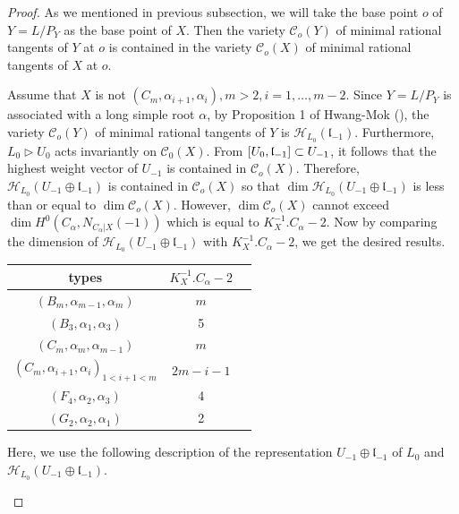 \documentclass[12pt]{amsart}
\theoremstyle{plain}
\theoremstyle{definition}
\begin{document}
\begin{proof} As we mentioned in previous subsection, we will take the base point $o$ of $Y=L/P_Y$ as the base point of $X$.  Then the variety $\mathcal C_o(Y)$ of minimal rational tangents of $Y$ at $o$  is contained in the variety $\mathcal C_o(X)$ of minimal rational tangents of $X$ at $o$.

\medskip
Assume that $X$ is not $(C_m, \alpha_{i+1}, \alpha_{i}), m>2, i=1,\ldots, m-2$. Since $Y=L/P_Y$ is associated with a long simple root $\alpha$, by Proposition 1 of Hwang-Mok (\cite{HM02}), the variety $\mathcal C_o(Y)$ of minimal rational tangents of $Y$ is  $\mathcal H_{L_0}(\mathfrak l_{-1})$. Furthermore, $L_0 \rhd U_{0}$ acts invariantly on $\mathcal C_0(X)$. From $[U_{0}, \frak l_{-1}] \subset U_{-1}$, it follows that the highest weight vector of $U_{-1}$ is contained in $\mathcal C_o(X)$. Therefore,  $\mathcal H_{L_0}( U_{-1}\oplus \mathfrak l_{-1})$ is contained in  $\mathcal C_o(X)$ so that $\dim \mathcal H_{L_0}( U_{-1}\oplus \mathfrak l_{-1})$ is less than or equal to $\dim \mathcal C_o(X)$. However, $\dim \mathcal C_o(X)$ cannot exceed $\dim H^0(C_{\alpha}, N_{C_{\alpha}|X} (-1))$ which is equal to   $K^{-1}_X.C_{\alpha}-2$. %
Now by comparing the dimension of $\mathcal H_{L_0}( U_{-1}\oplus \mathfrak l_{-1})$ with   $K^{-1}_X.C_{\alpha} -2$, we get the desired results.
\begin{center}
    \begin{tabular}{ c c  c  }
types & $K^{-1}_X.C_{\alpha}-2$ \\
\hline
$(B_m, \alpha_{m-1}, \alpha_{m})$ & $m$ \\
$(B_3, \alpha_{1}, \alpha_{3})$ & 5 \\
$(C_m, \alpha_{m}, \alpha_{m-1})$ & $m$ \\
$(C_m, \alpha_{i+1}, \alpha_{i})_{ 1 < i+1 < m}$ & $2m-i-1$ \\
$(F_{4}, \alpha_{2}, \alpha_{3})$ & 4\\
$(G_{2}, \alpha_{2}, \alpha_{1})$ & 2 \\
    \end{tabular}
\end{center}
 Here, we use the following description of the representation $ U_{-1}\oplus \mathfrak l_{-1}$ of $L_0$ and $\mathcal H_{L_0}( U_{-1}\oplus \mathfrak l_{-1})$.

\begin{enumerate}


\end{enumerate}
\end{proof}
\end{document}
